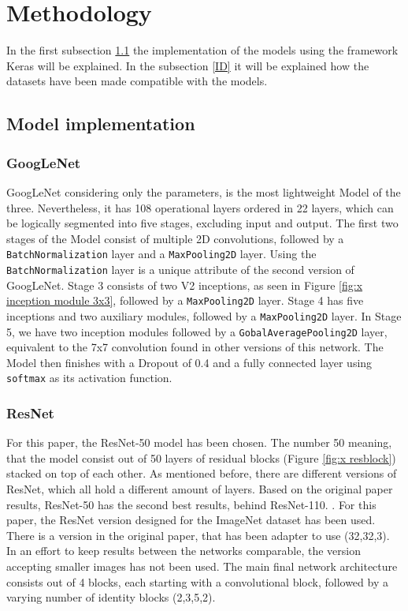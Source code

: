 \documentclass[conference]{IEEEtran}
\begin{document}
\section{Methodology}\label{C3}
In the first subsection \ref{IM} the implementation of the models using the framework Keras will be explained.
In the subsection \ref{ID} it will be explained how the datasets have been made compatible with the models.
\subsection{Model implementation}\label{IM}
\subsubsection{GoogLeNet}
GoogLeNet considering only the parameters, is the most lightweight Model of the three. Nevertheless, it has 108 operational layers ordered in 22 layers, which can be logically segmented into five stages, excluding input and output. 
The first two stages of the Model consist of multiple 2D convolutions, followed by a \verb|BatchNormalization| layer and a \verb|MaxPooling2D| layer. Using the \verb|BatchNormalization| layer is a unique attribute of the second version of GoogLeNet.
Stage 3 consists of two V2 inceptions, as seen in Figure \ref{fig:x inception module 3x3}, followed by a \verb|MaxPooling2D| layer.
Stage 4 has five inceptions and two auxiliary modules, followed by a \verb|MaxPooling2D| layer. 
In Stage 5, we have two inception modules followed by a \verb|GobalAveragePooling2D| layer, equivalent to the 7x7 convolution found in other versions of this network.
The Model then finishes with a Dropout of 0.4 and a fully connected layer using \verb|softmax| as its activation function.
\cite{szegedy_rethinking_2015}

\subsubsection{ResNet}
For this paper, the ResNet-50 model has been chosen. 
The number 50 meaning, that the model consist out of 50 layers of residual blocks (Figure \ref{fig:x resblock}) stacked on top of each other. 
As mentioned before, there are different versions of ResNet, which all hold a different amount of layers. 
Based on the original paper results, ResNet-50 has the second best results, behind ResNet-110. \cite{he_deep_2015}.  
For this paper, the ResNet version designed for the ImageNet dataset has been used. There is a version in the original paper, that has been adapter to use (32,32,3). 
In an effort to keep results between the networks comparable, the version accepting smaller images has not been used.
The main final network architecture consists out of 4 blocks, each starting with a convolutional block, followed by a varying number of identity blocks (2,3,5,2).
\end{document}
